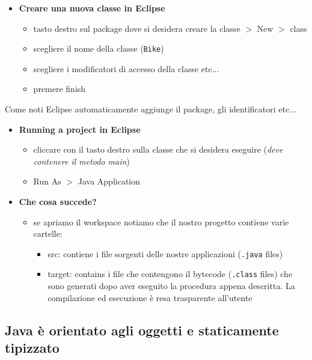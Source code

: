 \documentclass{article}
\theoremstyle{definition}
\begin{document}
\begin{itemize}
\item \textbf{Creare una nuova classe in Eclipse}
\begin{itemize}
\item tasto destro sul package dove si desidera creare la classe  $>$ New $>$ class 
\item scegliere il nome della classe (\texttt{Bike})
\item scegliere i modificatori di accesso della classe etc...
\item premere finish
\end{itemize}
\end{itemize}
Come noti  Eclipse automaticamente aggiunge il package, gli identificatori etc...

\begin{itemize}
\item \textbf{Running a project in Eclipse}
\begin{itemize}
\item cliccare con il tasto destro sulla classe che si desidera eseguire (\emph{deve contenere il metodo  main})
\item Run As $>$ Java Application
\end{itemize}
\end{itemize}

\begin{itemize}
\item \textbf{Che cosa succede?}
\begin{itemize}
\item se apriamo il workspace notiamo che il nostro progetto contiene varie cartelle: 
\begin{itemize}
\item src: contiene i file sorgenti delle nostre applicazioni (\texttt{.java} files)
\item target: contains i file che contengono il bytecode (\texttt{.class} files) che sono generati dopo aver eseguito la procedura appena descritta. La compilazione ed esecuzione \`e resa trasparente all'utente
\end{itemize}
\end{itemize}
\end{itemize}

\subsection{Java \`e orientato agli oggetti e staticamente tipizzato}
\end{document}
